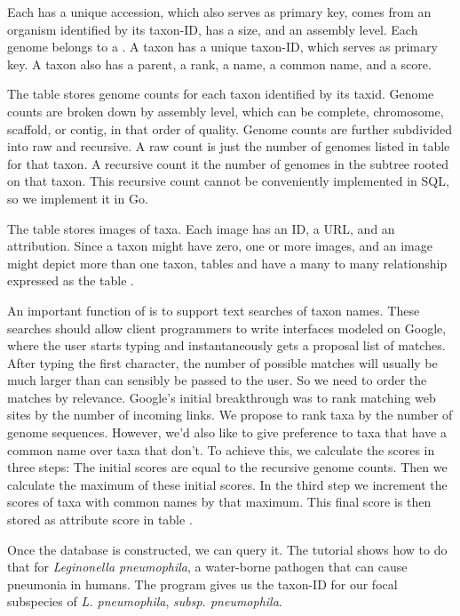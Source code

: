 Each  has a unique accession, which also serves as primary
key, comes from an organism identified by its taxon-ID, has a size,
and an assembly level. Each genome belongs to a . A taxon
has a unique taxon-ID, which serves as primary key. A taxon also has a
parent, a rank, a name, a common name, and a score.

The table  stores genome counts for each taxon
identified by its taxid. Genome counts are broken down by assembly
level, which can be complete, chromosome, scaffold, or contig, in that
order of quality. Genome counts are further subdivided into raw and
recursive. A raw count is just the number of genomes listed in
table  for that taxon. A recursive count it the number of
genomes in the subtree rooted on that taxon. This recursive count
cannot be conveniently implemented in SQL, so we implement it in Go.

The table  stores images of taxa. Each image has an ID, a
URL, and an attribution. Since a taxon might have zero, one or more
images, and an image might depict more than one taxon,
tables  and  have a many to many relationship
expressed as the table .

An important function of  is to support text searches of
taxon names. These searches should allow client programmers to write
interfaces modeled on Google, where the user starts typing and
instantaneously gets a proposal list of matches. After typing the
first character, the number of possible matches will usually be much
larger than can sensibly be passed to the user. So we need to order
the matches by relevance. Google's initial breakthrough was to rank
matching web sites by the number of incoming links. We propose to rank
taxa by the number of genome sequences. However, we'd also like to
give preference to taxa that have a common name over taxa that
don't. To achieve this, we calculate the scores in three steps: The
initial scores are equal to the recursive genome counts. Then we
calculate the maximum of these initial scores. In the third step we
increment the scores of taxa with common names by that maximum.  This
final score is then stored as attribute score in table .

Once the database is constructed, we can query it. The tutorial shows
how to do that for \emph{Leginonella pneumophila}, a water-borne
pathogen that can cause pneumonia in humans. The program 
gives us the taxon-ID for our focal subspecies
of \emph{L. pneumophila}, \emph{subsp. pneumophila}.

